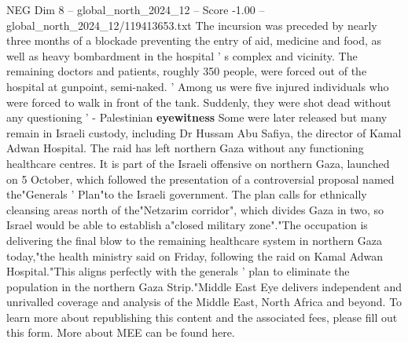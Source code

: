 \begin{textsample}{NEG Dim 8 – global\_north\_2024\_12 – Score -1.00 – global\_north\_2024\_12/119413653.txt}
The incursion was preceded by nearly three months of a blockade preventing the entry of aid, medicine and food, as well as heavy bombardment in the hospital ' s complex and vicinity.
The remaining doctors and patients, roughly 350 people, were forced out of the hospital at gunpoint, semi-naked. ' Among us were five injured individuals who were forced to walk in front of the tank.
Suddenly, they were shot dead without any questioning ' - Palestinian \textbf{eyewitness} Some were later released but many remain in Israeli custody, including Dr Hussam Abu Safiya, the director of Kamal Adwan Hospital.
The raid has left northern Gaza without any functioning healthcare centres.
It is part of the Israeli offensive on northern Gaza, launched on 5 October, which followed the presentation of a controversial proposal named the"Generals ' Plan"to the Israeli government.
The plan calls for ethnically cleansing areas north of the"Netzarim corridor", which divides Gaza in two, so Israel would be able to establish a"closed military zone"."The occupation is delivering the final blow to the remaining healthcare system in northern Gaza today,"the health ministry said on Friday, following the raid on Kamal Adwan Hospital."This aligns perfectly with the generals ' plan to eliminate the population in the northern Gaza Strip."Middle East Eye delivers independent and unrivalled coverage and analysis of the Middle East, North Africa and beyond.
To learn more about republishing this content and the associated fees, please fill out this form.
More about MEE can be found here.

\end{textsample}
